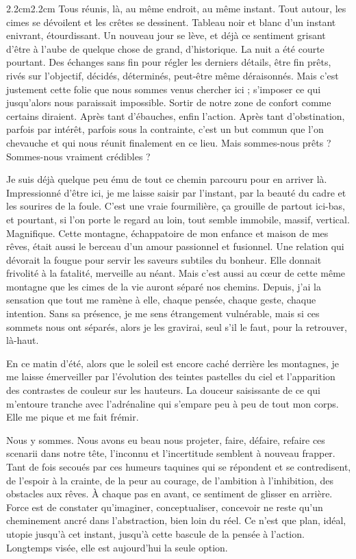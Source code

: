 \begin{adjustwidth}{2.2cm}{2.2cm}
Tous réunis, là, au même endroit, au même instant. Tout autour, les cimes se dévoilent et les crêtes se dessinent. Tableau noir et blanc d’un instant enivrant, étourdissant. Un nouveau jour se lève, et déjà ce sentiment grisant d’être à l’aube de quelque chose de grand, d’historique. La nuit a été courte pourtant. Des échanges sans fin pour régler les derniers détails, être fin prêts, rivés sur l’objectif, décidés, déterminés, peut-être même déraisonnés. Mais c’est justement cette folie que nous sommes venus chercher ici ; s’imposer ce qui jusqu’alors nous paraissait impossible. Sortir de notre zone de confort comme certains diraient. Après tant d’ébauches, enfin l’action. Après tant d’obstination, parfois par intérêt, parfois sous la contrainte, c’est un but commun que l’on chevauche et qui nous réunit finalement en ce lieu. Mais sommes-nous prêts ? Sommes-nous vraiment crédibles ?

Je suis déjà quelque peu ému de tout ce chemin parcouru pour en arriver là. Impressionné d’être ici, je me laisse saisir par l’instant, par la beauté du cadre et les sourires de la foule. C’est une vraie fourmilière, ça grouille de partout ici-bas, et pourtant, si l’on porte le regard au loin, tout semble immobile, massif, vertical. Magnifique. Cette montagne, échappatoire de mon enfance et maison de mes rêves, était aussi le berceau d’un amour passionnel et fusionnel. Une relation qui dévorait la fougue pour servir les saveurs subtiles du bonheur. Elle donnait frivolité à la fatalité, merveille au néant. Mais c’est aussi au cœur de cette même montagne que les cimes de la vie auront séparé nos chemins. Depuis, j’ai la sensation que tout me ramène à elle, chaque pensée, chaque geste, chaque intention. Sans sa présence, je me sens étrangement vulnérable, mais si ces sommets nous ont séparés, alors je les gravirai, seul s’il le faut, pour la retrouver, là-haut.

En ce matin d’été, alors que le soleil est encore caché derrière les montagnes, je me laisse émerveiller par l’évolution des teintes pastelles du ciel et l’apparition des contrastes de couleur sur les hauteurs. La douceur saisissante de ce qui m’entoure tranche avec l’adrénaline qui s’empare peu à peu de tout mon corps. Elle me pique et me fait frémir.

Nous y sommes. Nous avons eu beau nous projeter, faire, défaire, refaire ces scenarii dans notre tête, l’inconnu et l’incertitude semblent à nouveau frapper. Tant de fois secoués par ces humeurs taquines qui se répondent et se contredisent, de l’espoir à la crainte, de la peur au courage, de l’ambition à l’inhibition, des obstacles aux rêves. À chaque pas en avant, ce sentiment de glisser en arrière. Force est de constater qu’imaginer, conceptualiser, concevoir ne reste qu’un cheminement ancré dans l’abstraction, bien loin du réel. Ce n’est que plan, idéal, utopie jusqu’à cet instant, jusqu’à cette bascule de la pensée à l’action. Longtemps visée, elle est aujourd’hui la seule option.


\end{adjustwidth}
